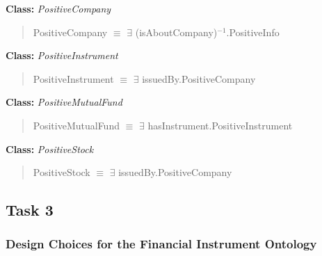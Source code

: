 \documentclass[
]{article}
\begin{document}
\textbf{Class:} \emph{PositiveCompany}

\begin{quote}
PositiveCompany \(\equiv\) \(\exists\)
(isAboutCompany)\(^{-1}\).PositiveInfo
\end{quote}

\textbf{Class:} \emph{PositiveInstrument}

\begin{quote}
PositiveInstrument \(\equiv\) \(\exists\) issuedBy.PositiveCompany
\end{quote}

\textbf{Class:} \emph{PositiveMutualFund}

\begin{quote}
PositiveMutualFund \(\equiv\) \(\exists\)
hasInstrument.PositiveInstrument
\end{quote}

\textbf{Class:} \emph{PositiveStock}

\begin{quote}
PositiveStock \(\equiv\) \(\exists\) issuedBy.PositiveCompany
\end{quote}

\subsection{\texorpdfstring{Task 3 }{Task 3 }}\label{task-3}

\subsubsection{Design Choices for the Financial Instrument
Ontology}\label{design-choices-for-the-financial-instrument-ontology}
\end{document}
